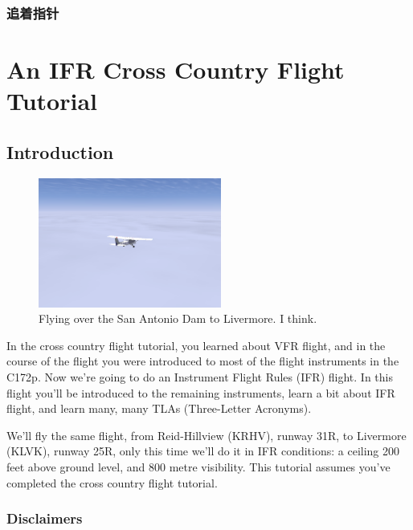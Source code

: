 \subsection{追着指针}



\fi
\iffalse
\chapter{An IFR Cross Country Flight Tutorial}
\label{IFR Tutorial}

\section{Introduction}

\begin{figure}[h]
  \begin{center}
    \includegraphics[width=6cm]{img/somewhere}
    \caption{Flying over the San Antonio Dam to Livermore.  I think.}
    \label{fig:somewhere}
  \end{center}
\end{figure}

In the cross country flight tutorial, you learned about VFR flight,
and in the course of the flight you were introduced to most of the
flight instruments in the C172p.  Now we're going to do an Instrument
Flight Rules (IFR) flight.  In this flight you'll be introduced to the
remaining instruments, learn a bit about IFR flight, and learn many,
many TLAs (Three-Letter Acronyms).

We'll fly the same flight, from Reid-Hillview (KRHV), runway 31R, to
Livermore (KLVK), runway 25R, only this time we'll do it in IFR
conditions: a ceiling 200 feet above ground level, and 800 metre
visibility.  This tutorial assumes you've completed the cross country
flight tutorial.
\subsection{Disclaimers}


